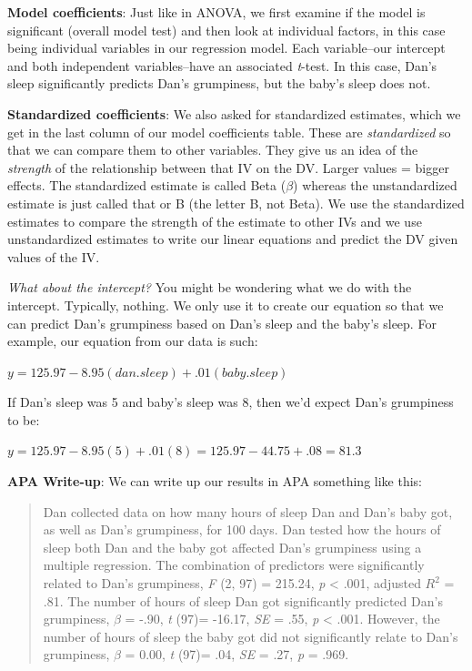 \documentclass[
]{book}
\begin{document}
\textbf{Model coefficients}: Just like in ANOVA, we first examine if the model is significant (overall model test) and then look at individual factors, in this case being individual variables in our regression model. Each variable--our intercept and both independent variables--have an associated \emph{t}-test. In this case, Dan's sleep significantly predicts Dan's grumpiness, but the baby's sleep does not.

\textbf{Standardized coefficients}: We also asked for standardized estimates, which we get in the last column of our model coefficients table. These are \emph{standardized} so that we can compare them to other variables. They give us an idea of the \emph{strength} of the relationship between that IV on the DV. Larger values = bigger effects. The standardized estimate is called Beta (\(\beta\)) whereas the unstandardized estimate is just called that or B (the letter B, not Beta). We use the standardized estimates to compare the strength of the estimate to other IVs and we use unstandardized estimates to write our linear equations and predict the DV given values of the IV.

\emph{What about the intercept?} You might be wondering what we do with the intercept. Typically, nothing. We only use it to create our equation so that we can predict Dan's grumpiness based on Dan's sleep and the baby's sleep. For example, our equation from our data is such:

\(y = 125.97 - 8.95(dan.sleep) + .01(baby.sleep)\)

If Dan's sleep was 5 and baby's sleep was 8, then we'd expect Dan's grumpiness to be:

\(y = 125.97 - 8.95(5) + .01(8) = 125.97 - 44.75 + .08 = 81.3\)

\textbf{APA Write-up}: We can write up our results in APA something like this:

\begin{quote}
Dan collected data on how many hours of sleep Dan and Dan's baby got, as well as Dan's grumpiness, for 100 days. Dan tested how the hours of sleep both Dan and the baby got affected Dan's grumpiness using a multiple regression. The combination of predictors were significantly related to Dan's grumpiness, \emph{F} (2, 97) = 215.24, \emph{p} \textless{} .001, adjusted \(R^2\) = .81. The number of hours of sleep Dan got significantly predicted Dan's grumpiness, \(\beta\) = -.90, \emph{t} (97)= -16.17, \emph{SE} = .55, \emph{p} \textless{} .001. However, the number of hours of sleep the baby got did not significantly relate to Dan's grumpiness, \(\beta\) = 0.00, \emph{t} (97)= .04, \emph{SE} = .27, \emph{p} = .969.
\end{quote}
\end{document}

